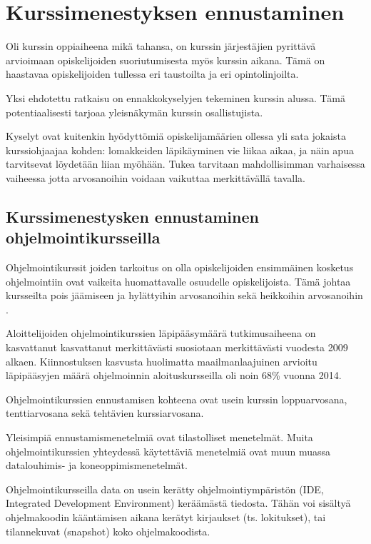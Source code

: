 \documentclass[finnish,twoside,openright]{HYgraduMLDS}
\begin{document}
\section{Kurssimenestyksen ennustaminen}

Oli kurssin oppiaiheena mikä tahansa, on kurssin järjestäjien pyrittävä arvioimaan opiskelijoiden suoriutumisesta myös kurssin aikana. Tämä on haastavaa opiskelijoiden tullessa eri taustoilta ja eri opintolinjoilta.

Yksi ehdotettu ratkaisu on ennakkokyselyjen tekeminen kurssin alussa\cite{watson2014no}. Tämä potentiaalisesti tarjoaa yleisnäkymän kurssin osallistujista.

Kyselyt ovat kuitenkin hyödyttömiä opiskelijamäärien ollessa yli sata jokaista kurssiohjaajaa kohden: lomakkeiden läpikäyminen vie liikaa aikaa, ja näin apua tarvitsevat löydetään liian myöhään. Tukea tarvitaan mahdollisimman varhaisessa vaiheessa jotta arvosanoihin voidaan vaikuttaa merkittävällä tavalla\cite{bergin2015using}.

\subsection{Kurssimenestysken ennustaminen ohjelmointikursseilla}

Ohjelmointikurssit joiden tarkoitus on olla opiskelijoiden ensimmäinen kosketus ohjelmointiin ovat vaikeita huomattavalle osuudelle opiskelijoista. Tämä johtaa kursseilta pois jäämiseen ja hylättyihin arvosanoihin sekä heikkoihin arvosanoihin \cite{bergin2015using}. 

Aloittelijoiden ohjelmointikurssien läpipääsymäärä tutkimusaiheena on kasvattanut kasvattanut merkittävästi suosiotaan merkittävästi vuodesta 2009 alkaen\cite{hellas2018predicting}. Kiinnostuksen kasvusta huolimatta maailmanlaajuinen arvioitu läpipääsyjen määrä ohjelmoinnin aloituskursseilla oli noin 68\% vuonna 2014\cite{watson2014failure}. 

Ohjelmointikurssien ennustamisen kohteena ovat usein kurssin loppuarvosana, tenttiarvosana sekä tehtävien kurssiarvosana. 

Yleisimpiä ennustamismenetelmiä ovat tilastolliset menetelmät\cite{hellas2018predicting}. Muita ohjelmointikurssien yhteydessä käytettäviä menetelmiä ovat muun muassa datalouhimis- ja koneoppimismenetelmät. 

Ohjelmointikursseilla data on usein kerätty ohjelmointiympäristön (IDE, Integrated Development Environment) keräämästä tiedosta. Tähän voi sisältyä ohjelmakoodin kääntämisen aikana kerätyt kirjaukset (ts. lokitukset), tai tilannekuvat (snapshot) koko ohjelmakoodista\cite{watson2013predicting, jadud2006methods, lagus2018transfer}.
\end{document}
